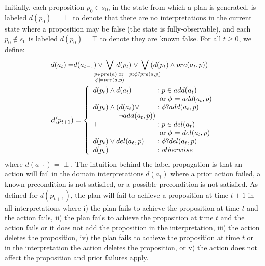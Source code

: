 \documentclass[letterpaper]{article}
\begin{document}
Initially, each proposition $p_0 \in s_0$, in the state from which a plan is
generated, is labeled $d(p_0) = \perp$ to denote that there are no
interpretations in the current state where a proposition may be false (the state is fully-observable), and each $p_0 \not\in
s_0$ is labeled $d(p_0)=\top$ to denote they are known false.
For all $t \geq 0$, we define:
 \begin{align}
\notag d({a}_t) =&  
d(a_{t-1}) \vee\hspace*{-.5cm} \bigvee\limits_{\substack{p \in pre(a)
\;\text{or}\;\\\phi \models pre(a, p)}}\hspace*{-.5cm} d(p_t) \vee
\hspace*{-.5cm}\bigvee\limits_{\substack{p : \phi?pre(a, p)}}
\hspace*{-.5cm}(d(p_t)\wedge pre({a}_t, p)  ) \notag %
\\
\notag\hspace*{-.1cm}d(p_{t+1}) &= \left\{
\begin{array}{l@{\;}l@{\;}r}
d(p_t) \wedge d({a}_t) & : p \in add({a}_t) \\ 
 & \;\text{or}\; \phi \models add({a}_t, p)\\
d(p_t) \wedge (d({a}_t) \vee & : \phi?add({a}_t,p)\\
 \hspace*{1.25cm} \neg add({a}_t, p)) \\  
\top & : p \in del({a}_t)\\
 & \;\text{or}\; \phi \models del({a}_t,p)\\
d(p_t) \vee  del({a}_t, p)  &: \phi?del({a}_t, p)\\
d(p_t) & : {otherwise} 
\end{array}
\right. 
\end{align}
\noindent where $d({a}_{-1}) = \perp$. The intuition behind the label
propagation is that an action will fail  in the
domain interpretations $d({a}_t)$ where a prior action failed, a known
precondition is not satisfied, or a possible precondition is not satisfied. As defined for
$d(p_{t+1})$, the plan will fail to achieve a proposition at time $t+1$ in all
interpretations where i) the plan fails to achieve the proposition at time $t$ and the action fails, ii) the plan fails to achieve the proposition at
time $t$ and the action fails or it does not add the proposition in the
interpretation, iii) the action deletes the proposition, iv) the plan fails to
achieve the proposition at time $t$ or in the interpretation the action deletes
the proposition, or v) the action does not affect the proposition and  prior
failures  apply.             
\end{document}
